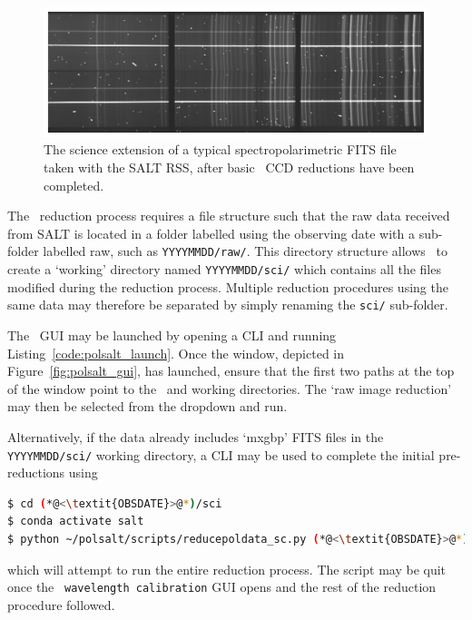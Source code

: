 \begin{figure}[t]
    \centering
    \includegraphics[width = 1.0\textwidth]{figures/3_pre_wav_cal.pdf}
    \caption{The science extension of a typical spectropolarimetric \acs{FITS} file taken with the \gls{SALT} \gls{RSS}, after basic \polsalt\ \gls{CCD} reductions have been completed.}
    \label{fig:polsalt_pre_wav_cal}
\end{figure}

The \polsalt\ reduction process requires a file structure such that the raw data received from \gls{SALT} is located in a folder labelled using the observing date with a sub-folder labelled raw, such as \texttt{YYYYMMDD/raw/}. This directory structure allows \polsalt\ to create a `working' directory named \texttt{YYYYMMDD/sci/} which contains all the files modified during the reduction process. Multiple reduction procedures using the same data may therefore be separated by simply renaming the \texttt{sci/} sub-folder.

The \polsalt\ \gls{GUI} may be launched by opening a \gls{CLI} and running Listing~\ref{code:polsalt_launch}. Once the window, depicted in Figure~\ref{fig:polsalt_gui}, has launched, ensure that the first two paths at the top of the window point to the \polsalt\ and working directories. The `raw image reduction' may then be selected from the dropdown and run.

Alternatively, if the data already includes `mxgbp' \gls{FITS} files in the \texttt{YYYYMMDD/sci/} working directory, a \gls{CLI} may be used to complete the initial pre-reductions using
\begin{lstlisting}[language=bash]
$ cd (*@<\textit{OBSDATE}>@*)/sci
$ conda activate salt
$ python ~/polsalt/scripts/reducepoldata_sc.py (*@<\textit{OBSDATE}>@*)
\end{lstlisting}
{\parskip=0pt which} will attempt to run the entire reduction process. The script may be quit once the \polsalt\ \texttt{wavelength calibration} \gls{GUI} opens and the rest of the reduction procedure followed.

